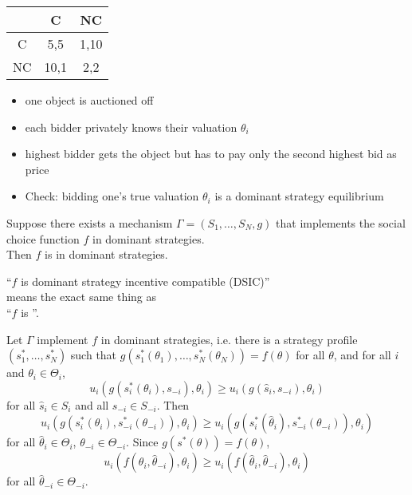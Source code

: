 \documentclass[english,handout,10pt]{beamer}		%
\def\lyxframeend{} %
\begin{document}
\begin{example}
	\begin{center}
		\begin{tabular}{c | c | c |}
			& C & NC\\ \hline
			C& 5,5 &1,10\\ \hline
			NC&10,1&2,2\\ \hline
		\end{tabular}
	\end{center}
\end{example}
\lyxframeend


\begin{example}
	\begin{itemize}
		\item one object is auctioned off
		\item each bidder privately knows their valuation $\theta_{i}$ 
		\item highest bidder gets the object but has to pay only the second highest bid as price
		\item Check: bidding one's true valuation $\theta_{i}$ is a dominant strategy equilibrium
	\end{itemize}
\end{example}
\lyxframeend


\begin{theorem}
	Suppose there exists a mechanism $\Gamma=(S_{1},\dots,S_{N},g)$ that implements the social choice function $f$ in dominant strategies.\\ Then $f$ is  in dominant strategies.
\end{theorem}
\pause\medskip
\begin{definition}
	``$f$ is \alert{dominant strategy incentive compatible} (DSIC)''\\ 
	means the exact same thing as \\
	``$f$ is ''.
\end{definition}
\lyxframeend


Let $\Gamma$ implement $f$ in dominant strategies, i.e. there is a strategy profile  $(s_1^*,\dots,s_N^*)$ such that $g(s_1^*(\theta_{1}),\dots,s_N^*(\theta_{N}))=f(\theta)$ for all $\theta$, and for all $i$ and  $\theta_{i}\in\Theta_{i}$,
$$ u_{i}(g(s_{i}^{*}(\theta_{i}),s_{-i}),\theta_{i})\geq u_{i}(g(\hat s_{i},s_{-i}),\theta_{i})$$
for all $\hat s_{i}\in S_{i}$ and all $s_{-i}\in S_{-i}$. 
\pause
Then
$$ u_{i}(g(s_{i}^{*}(\theta_{i}), s_{-i}^{*}(\theta_{-i})),\theta_{i})\geq u_i (g(s^*_i(\hat{\theta}_i), s_{-i}^{*}(\theta_{-i})), \theta_i)$$
for all $\hat{\theta}_i \in \Theta_i$, $\theta_{-i} \in \Theta_{-i}$. 
\pause
Since $g(s^*(\theta)) = f(\theta)$,
$$ u_i (f(\theta_i,\hat{\theta}_{-i}),\theta_i) \geq u_i (f(\hat{\theta}_i,\hat{\theta}_{-i}), \theta_i)$$
for all $\hat{\theta}_{-i} \in \Theta_{-i}$.
\lyxframeend
\end{document}
